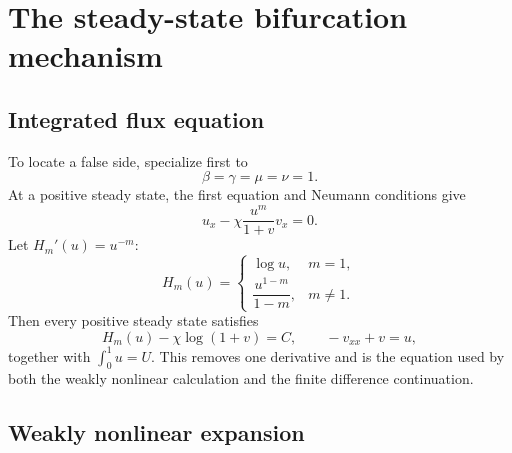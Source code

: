 \documentclass[11pt]{article}
\begin{document}
\section{The steady-state bifurcation mechanism}

\subsection{Integrated flux equation}

To locate a false side, specialize first to
\[
  \beta=\gamma=\mu=\nu=1.
\]
At a positive steady state, the first equation and Neumann conditions give
\[
  u_x-\chi\frac{u^m}{1+v}v_x=0.
\]
Let \(H_m'(u)=u^{-m}\):
\[
 H_m(u)=
 \begin{cases}
  \log u,&m=1,\\[1mm]
  \dfrac{u^{1-m}}{1-m},&m\ne1.
 \end{cases}
\]
Then every positive steady state satisfies
\begin{equation}
  H_m(u)-\chi\log(1+v)=C,\qquad
  -v_{xx}+v=u,                                         \label{eq:integrated}
\end{equation}
together with \(\int_0^1u=U\).  This removes one derivative and is the
equation used by both the weakly nonlinear calculation and the finite
difference continuation.

\subsection{Weakly nonlinear expansion}
\end{document}
